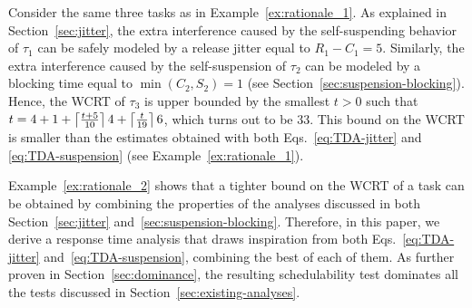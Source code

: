 \begin{example}
\label{ex:rationale_2}  
Consider the same three tasks as in Example~\ref{ex:rationale_1}. As explained in Section~\ref{sec:jitter}, the extra interference caused by the self-suspending behavior of $\tau_1$ can be safely modeled by a release jitter equal to $R_1 - C_1 = 5$. Similarly, the extra interference caused by the self-suspension of $\tau_2$ can be modeled by a blocking time equal to $\min(C_2,S_2) = 1$ (see Section~\ref{sec:suspension-blocking}). Hence, the WCRT of $\tau_3$ is upper bounded by the smallest $t>0$ such that $t = 4 + 1 +\left\lceil{ \frac{t + 5}{10} }\right\rceil 4 +\left\lceil{ \frac{t}{19} }\right\rceil 6$, which turns out to be $33$. This bound on the WCRT is smaller than the estimates obtained with both Eqs.~\eqref{eq:TDA-jitter} and \eqref{eq:TDA-suspension} (see Example~\ref{ex:rationale_1}).
\hfill\myendproof
\end{example}


Example~\ref{ex:rationale_2} shows that a tighter bound on the WCRT of a task can be obtained by combining the properties of the analyses discussed in both Section~\ref{sec:jitter} and~\ref{sec:suspension-blocking}. Therefore, in this paper, we derive a response time analysis that draws inspiration from both Eqs.~\eqref{eq:TDA-jitter} and~\eqref{eq:TDA-suspension}, combining the best of each of them. As further proven in Section~\ref{sec:dominance}, the resulting schedulability test dominates all the tests discussed in Section~\ref{sec:existing-analyses}.




